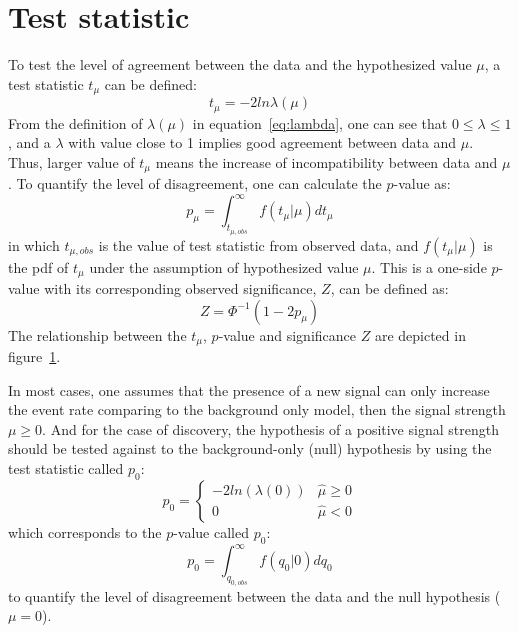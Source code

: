 \section{Test statistic}

To test the level of agreement between the data and the hypothesized value $\mu$, a test statistic $t_{\mu}$ can be defined:
\begin{equation}
    t_{\mu} = -2 ln \lambda (\mu)
\end{equation}
From the definition of $\lambda(\mu)$ in equation~\ref{eq:lambda}, one can see that $0 \le \lambda \le 1$,
and a $\lambda$ with value close to 1 implies good agreement between data and $\mu$.
Thus, larger value of $t_{\mu}$ means the increase of incompatibility between data and $\mu$.
To quantify the level of disagreement, one can calculate the $p$-value as:
\begin{equation}
    p_{\mu} = \int_{t_{\mu, obs}}^{\infty} f(t_{\mu}|\mu) d t_{\mu}
\end{equation}
in which $t_{\mu, obs}$ is the value of test statistic from observed data, 
and $f(t_{\mu}|\mu)$ is the pdf of $t_{\mu}$ under the assumption of hypothesized value $\mu$.
This is a one-side $p$-value with its corresponding observed significance, $Z$, can be defined as:
\begin{equation}
    Z = \Phi^{-1}(1-2p_{\mu})
\end{equation}
The relationship between the $t_{\mu}$, $p$-value and significance $Z$ are depicted in figure~\ref{}.


In most cases, one assumes that the presence of a new signal can only increase the event rate comparing to the background only model,
then the signal strength $\mu \ge 0$.
And for the case of discovery, the hypothesis of a positive signal strength should be tested against to the background-only (null) hypothesis by using the test statistic called $p_0$:
\begin{equation}
    p_0 = 
    \begin{cases}
        -2 ln(\lambda(0)) &\hat{\mu} \ge 0 \\
        0                 &\hat{\mu} < 0
    \end{cases}
\end{equation}
which corresponds to the $p$-value called $p_0$:
\begin{equation}
    p_0 = \int_{q_{0, obs}}^{\infty} f(q_0|0) d q_0
\end{equation}
to quantify the level of disagreement between the data and the null hypothesis ($\mu = 0$).
